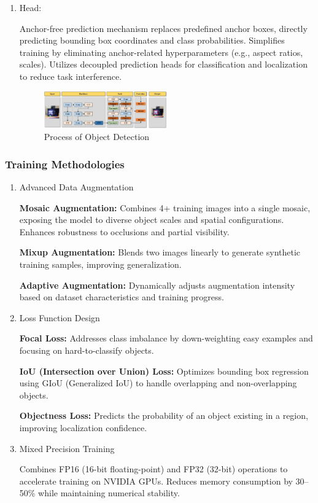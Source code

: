 \documentclass{article}
\begin{document}
\begin{enumerate}
\item  Head:

Anchor-free prediction mechanism replaces predefined anchor boxes, directly predicting bounding box coordinates and class probabilities.
Simplifies training by eliminating anchor-related hyperparameters (e.g., aspect ratios, scales).
Utilizes decoupled prediction heads for classification and localization to reduce task interference.

\begin{figure}[htb]
    \centering
    \includegraphics[width=0.5\textwidth]{images/Process of Object Detection.jpg}
    \caption{Process of Object Detection}
    \label{fig:object_detection_process}
\end{figure}

\end{enumerate}

\subsubsection{Training Methodologies}

\begin{enumerate}
    \item Advanced Data Augmentation
    
    \textbf{Mosaic Augmentation:} Combines 4+ training images into a single mosaic, exposing the model to diverse object scales and spatial configurations. Enhances robustness to occlusions and partial visibility.
    
    \textbf{Mixup Augmentation:} Blends two images linearly to generate synthetic training samples, improving generalization.
    
    \textbf{Adaptive Augmentation:} Dynamically adjusts augmentation intensity based on dataset characteristics and training progress.

    \item Loss Function Design
    
    \textbf{Focal Loss:} Addresses class imbalance by down-weighting easy examples and focusing on hard-to-classify objects.
    
    \textbf{IoU (Intersection over Union) Loss:} Optimizes bounding box regression using GIoU (Generalized IoU)\cite{Rezatofighi2019GeneralizedIO} to handle overlapping and non-overlapping objects.
    
    \textbf{Objectness Loss:} Predicts the probability of an object existing in a region, improving localization confidence.

    \item Mixed Precision Training
    
    Combines FP16 (16-bit floating-point) and FP32 (32-bit) operations to accelerate training on NVIDIA GPUs. Reduces memory consumption by 30--50\% while maintaining numerical stability.

\end{enumerate}
\end{document}
